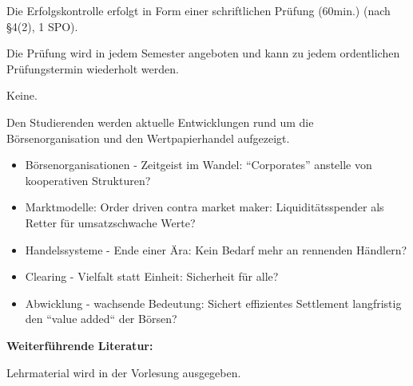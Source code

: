 \begin{course}

\setdoclanguagegerman
{}



\coursehead


\label{cour_6289.dp_997}


\begin{styleenv}
\begin{assessment}
Die Erfolgskontrolle erfolgt in Form einer schriftlichen Prüfung (60min.) (nach §4(2), 1 SPO).

 

Die Prüfung wird in jedem Semester angeboten und kann zu jedem ordentlichen Prüfungstermin wiederholt werden.


\end{assessment}

\begin{conditions}Keine.\end{conditions}


\end{styleenv}

\begin{learningoutcomes}
Den Studierenden werden aktuelle Entwicklungen rund um die Börsenorganisation und den Wertpapierhandel aufgezeigt.


\end{learningoutcomes}

\begin{content}
\begin{itemize}\item Börsenorganisationen - Zeitgeist im Wandel: “Corporates” anstelle von kooperativen Strukturen?  \item Marktmodelle: Order driven contra market maker: Liquiditätsspender als Retter für umsatzschwache Werte?  \item Handelssysteme - Ende einer Ära: Kein Bedarf mehr an rennenden Händlern?  \item Clearing - Vielfalt statt Einheit: Sicherheit für alle?  \item Abwicklung - wachsende Bedeutung: Sichert effizientes Settlement langfristig den “value added“ der Börsen?  \end{itemize}
\end{content}



\begin{literature}\textbf{Weiterführende Literatur:}

 

Lehrmaterial wird in der Vorlesung ausgegeben.

\end{literature}



\end{course}